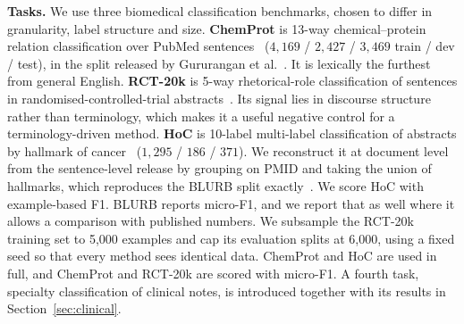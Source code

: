 \documentclass[conference,onecolumn]{IEEEtran}
\begin{document}
\noindent\textbf{Tasks.}
We use three biomedical classification benchmarks, chosen to differ in
granularity, label structure and size. \textbf{ChemProt}
is 13-way chemical--protein relation classification over PubMed
sentences~\cite{krallinger2017chemprot} ($4{,}169$ / $2{,}427$ / $3{,}469$
train / dev / test), in the split released by Gururangan et
al.~\cite{gururangan2020dapt}. It is lexically the furthest from general
English. \textbf{RCT-20k} is 5-way rhetorical-role classification of sentences
in randomised-controlled-trial abstracts~\cite{dernoncourt2017rct}. Its signal
lies in discourse structure rather than terminology, which makes it a useful
negative control for a terminology-driven method. \textbf{HoC} is 10-label
multi-label classification of abstracts by hallmark of
cancer~\cite{baker2016hoc} ($1{,}295$ / $186$ / $371$). We reconstruct it at
document level from the sentence-level release by grouping on PMID and taking
the union of hallmarks, which reproduces the BLURB split
exactly~\cite{gu2021pubmedbert}. We score HoC with example-based F1. BLURB
reports micro-F1, and we report that as well where it allows a comparison with
published numbers. We subsample the RCT-20k training set to 5{,}000
examples and cap its evaluation splits at 6{,}000, using a fixed seed so that
every method sees identical data. ChemProt and HoC are used in full, and
ChemProt and RCT-20k are scored with micro-F1. A fourth task, specialty
classification of clinical notes, is introduced together with its results in
Section~\ref{sec:clinical}.
\end{document}
